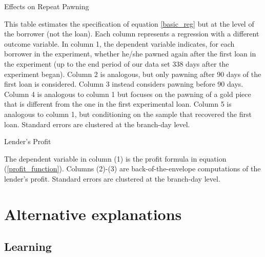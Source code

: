 \begin{appendix}
\begin{table}[!h]
\caption{Effects on Repeat Pawning}
\label{repeat_loans}
\begin{center}
\footnotesize{}
\end{center}
 \footnotesize{This table estimates the specification of equation \ref{basic_reg} but at the level of the borrower (not the loan). Each column represents a regression with a different outcome variable. In column 1, the dependent variable indicates, for each borrower in the experiment, whether he/she pawned again after the first loan in the experiment (up to the end period of our data set 338 days after the experiment began). Column 2 is analogous, but only pawning after 90 days of the first loan is considered. Column 3 instead considers pawning before 90 days. Column 4 is analogous to column 1 but focuses on the pawning of a gold piece that is different from the one in the first experimental loan. Column 5 is analogous to column 1, but conditioning on the sample that recovered the first loan. 
Standard errors are clustered at the branch-day level.}
\end{table}



\begin{table}[!h]
\caption{Lender's Profit}
\label{lenders_profit}
\begin{center}
 \footnotesize{}
\end{center}
 \footnotesize{ The dependent variable in column (1) is the profit formula in equation (\ref{profit_function}). Columns (2)-(3) are back-of-the-envelope computations of the lender's profit.
 Standard errors are clustered at the branch-day level.}
\end{table}

\newpage

\section{ Alternative explanations}
\subsection{Learning}



\end{appendix}
